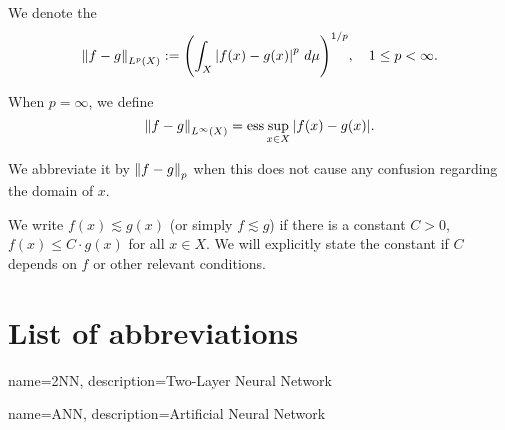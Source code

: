We denote the 
\begin{equation*}
    \left\| f - g \right\|_{L^{p}(X)} := 
    \Biggl( \int_X \left| f(x) - g(x) \right|^p \, d\mu \Biggr)^{1/p}, \quad
    1 \leq p < \infty.
\end{equation*}

When $p = \infty$, we define 
\begin{equation*}
    \left\| f - g \right\|_{L^{\infty}(X)} = \operatorname*{ess}{\sup_{x\in X} \left| f(x) - g(x) \right|}.
\end{equation*}

We abbreviate it by $\left\| f - g \right\|_{p}$ when this does not cause any confusion
regarding the domain of $x$.

We write $f(x) \lesssim g(x)$ (or simply $f \lesssim g$) if there is a constant
$C>0$, $f(x) \leq C \cdot g(x)$ for all $x \in X$. We will explicitly state the
constant if $C$ depends on $f$ or other relevant conditions.

\section*{List of abbreviations}

\printglossary

{
    name=2NN,
    description={Two-Layer Neural Network}
}

{
    name=ANN,
    description={Artificial Neural Network}
}





